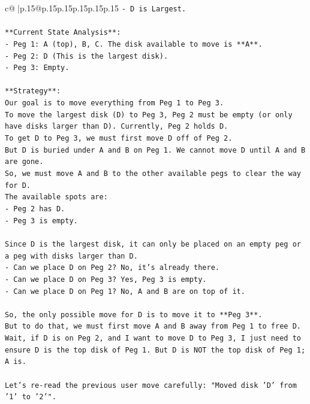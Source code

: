 \documentclass{article}
\begin{document}
{\begin{supertabular}{c@{$\;$}|p{.15\linewidth}@{}p{.15\linewidth}p{.15\linewidth}p{.15\linewidth}p{.15\linewidth}p{.15\linewidth}}
{{{\texttt{{-} D is Largest.} \\
\\ 
\texttt{**Current State Analysis**:} \\
\texttt{{-} Peg 1: A (top), B, C. The disk available to move is **A**.} \\
\texttt{{-} Peg 2: D (This is the largest disk).} \\
\texttt{{-} Peg 3: Empty.} \\
\\ 
\texttt{**Strategy**:} \\
\texttt{Our goal is to move everything from Peg 1 to Peg 3.} \\
\texttt{To move the largest disk (D) to Peg 3, Peg 2 must be empty (or only have disks larger than D). Currently, Peg 2 holds D.} \\
\texttt{To get D to Peg 3, we must first move D off of Peg 2.} \\
\texttt{But D is buried under A and B on Peg 1. We cannot move D until A and B are gone.} \\
\texttt{So, we must move A and B to the other available pegs to clear the way for D.} \\
\texttt{The available spots are:} \\
\texttt{{-} Peg 2 has D.} \\
\texttt{{-} Peg 3 is empty.} \\
\\ 
\texttt{Since D is the largest disk, it can only be placed on an empty peg or a peg with disks larger than D.} \\
\texttt{{-} Can we place D on Peg 2? No, it's already there.} \\
\texttt{{-} Can we place D on Peg 3? Yes, Peg 3 is empty.} \\
\texttt{{-} Can we place D on Peg 1? No, A and B are on top of it.} \\
\\ 
\texttt{So, the only possible move for D is to move it to **Peg 3**.} \\
\texttt{But to do that, we must first move A and B away from Peg 1 to free D.} \\
\texttt{Wait, if D is on Peg 2, and I want to move D to Peg 3, I just need to ensure D is the top disk of Peg 1. But D is NOT the top disk of Peg 1; A is.} \\
\\ 
\texttt{Let's re{-}read the previous user move carefully: "Moved disk 'D' from '1' to '2'".} \\
}}}
\end{supertabular}}
\end{document}
